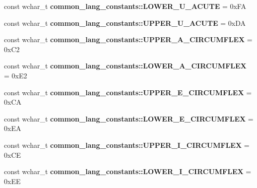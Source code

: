 \begin{DoxyCompactItemize}
\item 
\hypertarget{group___indexing_ga7990e23dc8b274721e95d514b132e527}{const wchar\-\_\-t {\bfseries common\-\_\-lang\-\_\-constants\-::\-L\-O\-W\-E\-R\-\_\-\-U\-\_\-\-A\-C\-U\-T\-E} = 0x\-F\-A}\label{group___indexing_ga7990e23dc8b274721e95d514b132e527}

\item 
\hypertarget{group___indexing_gae54aa538d9d07f6f25a8f73d8eb2833b}{const wchar\-\_\-t {\bfseries common\-\_\-lang\-\_\-constants\-::\-U\-P\-P\-E\-R\-\_\-\-U\-\_\-\-A\-C\-U\-T\-E} = 0x\-D\-A}\label{group___indexing_gae54aa538d9d07f6f25a8f73d8eb2833b}

\item 
\hypertarget{group___indexing_ga0db3e810078e521ab820575a64467abd}{const wchar\-\_\-t {\bfseries common\-\_\-lang\-\_\-constants\-::\-U\-P\-P\-E\-R\-\_\-\-A\-\_\-\-C\-I\-R\-C\-U\-M\-F\-L\-E\-X} = 0x\-C2}\label{group___indexing_ga0db3e810078e521ab820575a64467abd}

\item 
\hypertarget{group___indexing_gafed8c4d83a9f1f6efa6e7005888be389}{const wchar\-\_\-t {\bfseries common\-\_\-lang\-\_\-constants\-::\-L\-O\-W\-E\-R\-\_\-\-A\-\_\-\-C\-I\-R\-C\-U\-M\-F\-L\-E\-X} = 0x\-E2}\label{group___indexing_gafed8c4d83a9f1f6efa6e7005888be389}

\item 
\hypertarget{group___indexing_gafef243c0040c9e7b0b0b634b36f17232}{const wchar\-\_\-t {\bfseries common\-\_\-lang\-\_\-constants\-::\-U\-P\-P\-E\-R\-\_\-\-E\-\_\-\-C\-I\-R\-C\-U\-M\-F\-L\-E\-X} = 0x\-C\-A}\label{group___indexing_gafef243c0040c9e7b0b0b634b36f17232}

\item 
\hypertarget{group___indexing_ga1dcf91de4a6f00a48aad67156d2fc152}{const wchar\-\_\-t {\bfseries common\-\_\-lang\-\_\-constants\-::\-L\-O\-W\-E\-R\-\_\-\-E\-\_\-\-C\-I\-R\-C\-U\-M\-F\-L\-E\-X} = 0x\-E\-A}\label{group___indexing_ga1dcf91de4a6f00a48aad67156d2fc152}

\item 
\hypertarget{group___indexing_gaf2c71f6d4713500826b358f1cc7fdc98}{const wchar\-\_\-t {\bfseries common\-\_\-lang\-\_\-constants\-::\-U\-P\-P\-E\-R\-\_\-\-I\-\_\-\-C\-I\-R\-C\-U\-M\-F\-L\-E\-X} = 0x\-C\-E}\label{group___indexing_gaf2c71f6d4713500826b358f1cc7fdc98}

\item 
\hypertarget{group___indexing_ga682bae2a59d0caada2b79b6cb1b0a3df}{const wchar\-\_\-t {\bfseries common\-\_\-lang\-\_\-constants\-::\-L\-O\-W\-E\-R\-\_\-\-I\-\_\-\-C\-I\-R\-C\-U\-M\-F\-L\-E\-X} = 0x\-E\-E}\label{group___indexing_ga682bae2a59d0caada2b79b6cb1b0a3df}


\end{DoxyCompactItemize}
